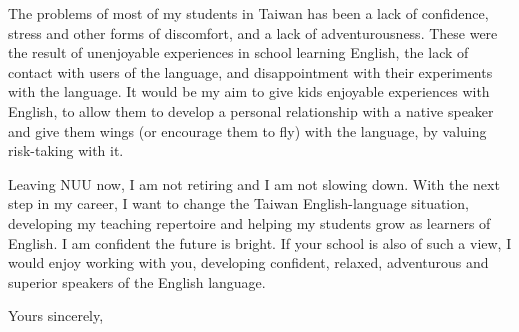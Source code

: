 \documentclass{letter}
\begin{document}
\begin{letter}{
}
The problems of most of my students in Taiwan has been a lack of confidence, stress and other forms of discomfort, and a lack of adventurousness. These were the result of unenjoyable experiences in school learning English, the lack of contact with users of the language, and disappointment with their experiments with the language. It would be my aim to give kids enjoyable experiences with English, to allow them to develop a personal relationship with a native speaker and give them wings (or encourage them to fly) with the language, by valuing risk-taking with it. 

Leaving NUU now, I am not retiring and I am not slowing down. With the next step in my career, I want to change the Taiwan English-language situation, developing my teaching repertoire and helping my students grow as learners of English. I am confident the future is bright. If your school is also of such a view, I would enjoy working with you, developing confident, relaxed, adventurous and superior speakers of the English language.

\closing{Yours sincerely,}


\end{letter}
\end{document}
